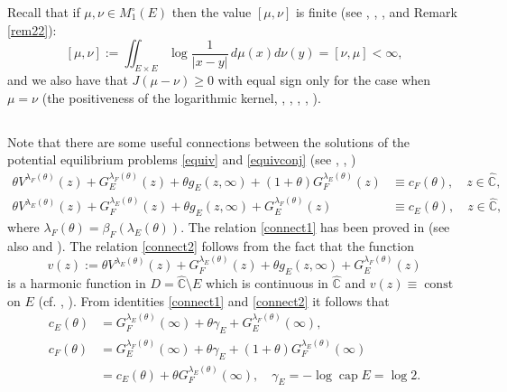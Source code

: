 \documentclass[11pt, a4paper, twoside]{article}
\let\geq\geqslant
\let\myh\widehat
\def\CC{\mathbb C}
\def\mcap{\operatorname{cap}}
\def\const{\operatorname{const}}
\theoremstyle{plain}
\theoremstyle{definition}
\begin{document}
Recall that if $\mu,\nu\in M^\circ_1(E)$ then the value $[\mu,\nu]$ is finite (see \cite{SaTo97}, \cite{Chi18}, \cite{Chi19}, \cite{Chi20} and Remark \ref{rem22}):
$$
[\mu,\nu]:=\iint_{E\times E}\log\frac1{|x-y|}\,d\mu(x)d\nu(y)
=[\nu,\mu]<\infty,
$$
and we also have that $J(\mu-\nu)\geq0$ with equal sign only for the case when $\mu=\nu$ (the positiveness of the logarithmic kernel, \cite{Lan66}, \cite{SaTo97}, \cite{Chi18}, \cite{Chi19}, \cite{Chi20}).


\subsection{}\label{s2s3}
Note that there are some useful connections between the solutions of the potential equilibrium
problems \eqref{equiv} and \eqref{equivconj} (see \cite[formula (24)]{BuSu15}, \cite{IkSu24}, \cite{Sue25})
\begin{align}
\theta V^{\lambda_F(\theta)}(z)+G^{\lambda_F(\theta)}_E(z)
+\theta g_E(z,\infty)+(1+\theta)G^{\lambda_E(\theta)}_F(z)&\equiv c_F(\theta),\quad z\in\myh{\CC},\label{connect1}\\
\theta V^{\lambda_E(\theta)}(z)+G^{\lambda_E(\theta)}_F(z)+\theta g_E(z,\infty)+G^{\lambda_F(\theta)}_E(z)&\equiv c_E(\theta),\quad z\in\myh{\CC},\label{connect2}
\end{align}
where $\lambda_F(\theta)=\beta_F(\lambda_E(\theta))$.
The relation \eqref{connect1} has been proved in \cite[formula (24)]{BuSu15} (see also \cite{IkSu24} and \cite{Sue25}).  The relation \eqref{connect2} follows from the fact that the function
$$
v(z):=\theta V^{\lambda_E(\theta)}(z)+G^{\lambda_E(\theta)}_F(z)+\theta g_E(z,\infty)+G^{\lambda_F(\theta)}_E(z)
$$
is a harmonic function in $D = \myh{\CC}\setminus E$ which is continuous in $\myh{\CC}$
and $v(z)\equiv\const$ on $E$ (cf. \cite{BuSu15}, \cite{Sue25}).
From identities \eqref{connect1} and \eqref{connect2} it follows that
\begin{equation}
\begin{aligned}
c_E(\theta)&=G^{\lambda_E(\theta)}_F(\infty)+\theta\gamma_E+G^{\lambda_F(\theta)}_E(\infty),\\
c_F(\theta)&=G^{\lambda_F(\theta)}_E(\infty)+\theta\gamma_E+(1+\theta)G^{\lambda_E(\theta)}_F(\infty)\\
&=c_E(\theta)+\theta G^{\lambda_E(\theta)}_F(\infty),\quad \gamma_E=-\log\mcap{E}=\log2.
\end{aligned}
\label{consts}
\end{equation}
\end{document}
